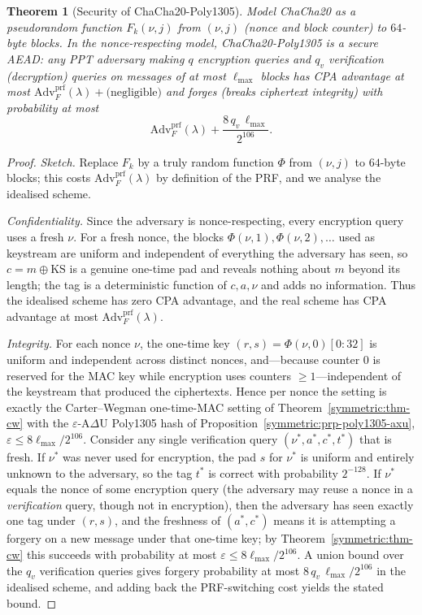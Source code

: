\documentclass[11pt,a4paper]{article}
\newtheorem{theorem}{Theorem}[section]
\theoremstyle{definition}
\theoremstyle{remark}
\begin{document}
\begin{theorem}[Security of ChaCha20-Poly1305]\label{symmetric:thm-chachapoly}
Model \textsf{ChaCha20} as a pseudorandom function \(F_k(\nu, j)\) from \((\nu, j)\) (nonce and block counter) to \(64\)-byte blocks. In the nonce-respecting model, \textsf{ChaCha20-Poly1305} is a secure AEAD: any PPT adversary making \(q\) encryption queries and \(q_v\) verification (decryption) queries on messages of at most \(\ell_{\max}\) blocks has CPA advantage at most \(\mathrm{Adv}^{\mathrm{prf}}_{F}(\lambda) + \text{(negligible)}\) and forges (breaks ciphertext integrity) with probability at most
\[
  \mathrm{Adv}^{\mathrm{prf}}_{F}(\lambda) + \frac{8\,q_v\,\ell_{\max}}{2^{106}}.
\]
\end{theorem}

\begin{proof}
\emph{Sketch.} Replace \(F_k\) by a truly random function \(\Phi\) from \((\nu, j)\) to \(64\)-byte blocks; this costs \(\mathrm{Adv}^{\mathrm{prf}}_F(\lambda)\) by definition of the PRF, and we analyse the idealised scheme.

\emph{Confidentiality.} Since the adversary is nonce-respecting, every encryption query uses a fresh \(\nu\). For a fresh nonce, the blocks \(\Phi(\nu, 1), \Phi(\nu, 2), \dots\) used as keystream are uniform and independent of everything the adversary has seen, so \(c = m \oplus \mathrm{KS}\) is a genuine one-time pad and reveals nothing about \(m\) beyond its length; the tag is a deterministic function of \(c, a, \nu\) and adds no information. Thus the idealised scheme has zero CPA advantage, and the real scheme has CPA advantage at most \(\mathrm{Adv}^{\mathrm{prf}}_F(\lambda)\).

\emph{Integrity.} For each nonce \(\nu\), the one-time key \((r,s) = \Phi(\nu, 0)[0{:}32]\) is uniform and independent across distinct nonces, and—because counter \(0\) is reserved for the MAC key while encryption uses counters \(\ge 1\)—independent of the keystream that produced the ciphertexts. Hence per nonce the setting is exactly the Carter--Wegman one-time-MAC setting of Theorem~\ref{symmetric:thm-cw} with the \(\varepsilon\)-A\(\Delta\)U \textsf{Poly1305} hash of Proposition~\ref{symmetric:prp-poly1305-axu}, \(\varepsilon \le 8\ell_{\max}/2^{106}\). Consider any single verification query \((\nu^\ast, a^\ast, c^\ast, t^\ast)\) that is fresh. If \(\nu^\ast\) was never used for encryption, the pad \(s\) for \(\nu^\ast\) is uniform and entirely unknown to the adversary, so the tag \(t^\ast\) is correct with probability \(2^{-128}\). If \(\nu^\ast\) equals the nonce of some encryption query (the adversary may reuse a nonce in a \emph{verification} query, though not in encryption), then the adversary has seen exactly one tag under \((r,s)\), and the freshness of \((a^\ast, c^\ast)\) means it is attempting a forgery on a new message under that one-time key; by Theorem~\ref{symmetric:thm-cw} this succeeds with probability at most \(\varepsilon \le 8\ell_{\max}/2^{106}\). A union bound over the \(q_v\) verification queries gives forgery probability at most \(8\,q_v\,\ell_{\max}/2^{106}\) in the idealised scheme, and adding back the PRF-switching cost yields the stated bound.
\end{proof}
\end{document}
